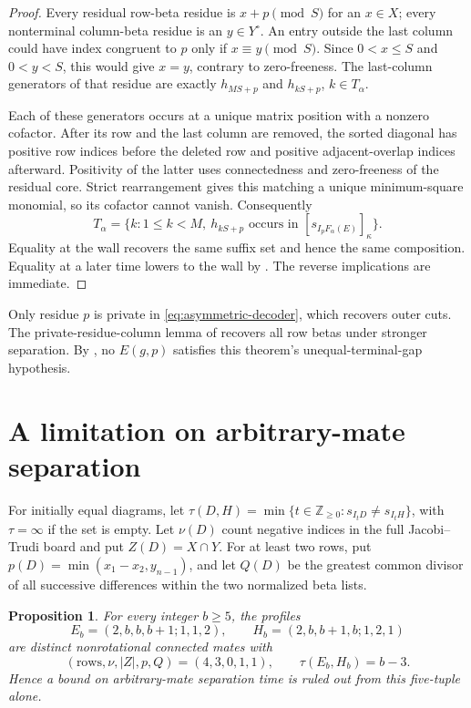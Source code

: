 \documentclass[11pt,a4paper]{amsart}
\numberwithin{equation}{section}
\theoremstyle{plain}
\newtheorem{proposition}[theorem]{Proposition}
\theoremstyle{definition}
\begin{document}
\begin{proof}
Every residual row-beta residue is \(x+p\pmod S\) for an
\(x\in X\); every nonterminal column-beta residue is an
\(y\in Y^\circ\).  An entry outside the last column could have
index congruent to \(p\) only if \(x\equiv y\pmod S\).
Since \(0<x\le S\) and \(0<y<S\), this would give
\(x=y\), contrary to zero-freeness.  The last-column generators
of that residue are exactly \(h_{MS+p}\) and
\(h_{kS+p}\), \(k\in T_\alpha\).

Each of these generators occurs at a unique matrix position with a
nonzero cofactor.  After its row and the last column are removed, the
sorted diagonal has positive row indices before the deleted row and
positive adjacent-overlap indices afterward.  Positivity of the latter
uses connectedness and zero-freeness of the residual core.  Strict
rearrangement gives this matching a unique minimum-square monomial,
so its cofactor cannot vanish.  Consequently
\begin{equation}\label{eq:asymmetric-decoder}
 T_\alpha=\{k:1\le k<M,\ h_{kS+p}\text{ occurs in }
                           [s_{I_pF_\alpha(E)}]_\kappa\}.
\end{equation}
Equality at the wall recovers the same suffix set and hence the same
composition.  Equality at a later time lowers to the wall by
.  The reverse implications are immediate.
\end{proof}

Only residue \(p\) is private in \eqref{eq:asymmetric-decoder},
which recovers outer cuts.  The private-residue-column lemma of
\cite{Shields2026Inflation} recovers all row betas under stronger
separation.  By , no \(E(g,p)\)
satisfies this theorem's unequal-terminal-gap hypothesis.

\section{A limitation on arbitrary-mate separation}\label{sec:limitation}

For initially equal diagrams, let
\(\tau(D,H)=\min\{t\in\mathbb Z_{\ge0}:s_{I_tD}\ne s_{I_tH}\}\),
with \(\tau=\infty\) if the set is empty.  Let \(\nu(D)\) count
negative indices in the full Jacobi--Trudi board and put
\(Z(D)=X\cap Y\).  For at least two rows, put
\(p(D)=\min(x_1-x_2,y_{n-1})\), and let \(Q(D)\) be the greatest
common divisor of all successive differences within the two normalized
beta lists.

\begin{proposition}\label{prop:limitation}
For every integer \(b\ge5\), the profiles
\[
 E_b=(2,b,b,b+1;1,1,2),\qquad
 H_b=(2,b,b+1,b;1,2,1)
\]
are distinct nonrotational connected mates with
\[
 (\text{rows},\nu,|Z|,p,Q)=(4,3,0,1,1),\qquad
 \tau(E_b,H_b)=b-3.
\]
Hence a bound on arbitrary-mate separation time is ruled out from this
five-tuple alone.
\end{proposition}
\end{document}

